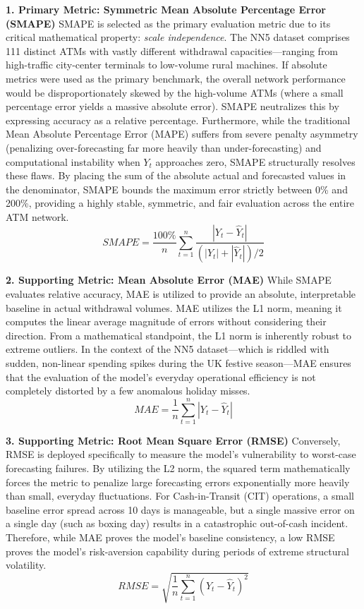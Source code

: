 \documentclass[conference, 12pt, onecolumn]{IEEEtran}
\begin{document}
\textbf{1. Primary Metric: Symmetric Mean Absolute Percentage Error (SMAPE)}
SMAPE is selected as the primary evaluation metric due to its critical mathematical property: \textit{scale independence}. The NN5 dataset comprises 111 distinct ATMs with vastly different withdrawal capacities—ranging from high-traffic city-center terminals to low-volume rural machines. If absolute metrics were used as the primary benchmark, the overall network performance would be disproportionately skewed by the high-volume ATMs (where a small percentage error yields a massive absolute error). SMAPE neutralizes this by expressing accuracy as a relative percentage. Furthermore, while the traditional Mean Absolute Percentage Error (MAPE) suffers from severe penalty asymmetry (penalizing over-forecasting far more heavily than under-forecasting) and computational instability when $Y_t$ approaches zero, SMAPE structurally resolves these flaws. By placing the sum of the absolute actual and forecasted values in the denominator, SMAPE bounds the maximum error strictly between 0\% and 200\%, providing a highly stable, symmetric, and fair evaluation across the entire ATM network.
$$SMAPE = \frac{100\%}{n} \sum_{t=1}^n \frac{|Y_t - \hat{Y}_t|}{(|Y_t| + |\hat{Y}_t|)/2}$$

\textbf{2. Supporting Metric: Mean Absolute Error (MAE)}
While SMAPE evaluates relative accuracy, MAE is utilized to provide an absolute, interpretable baseline in actual withdrawal volumes. MAE utilizes the L1 norm, meaning it computes the linear average magnitude of errors without considering their direction. From a mathematical standpoint, the L1 norm is inherently robust to extreme outliers. In the context of the NN5 dataset—which is riddled with sudden, non-linear spending spikes during the UK festive season—MAE ensures that the evaluation of the model's everyday operational efficiency is not completely distorted by a few anomalous holiday misses.
$$MAE = \frac{1}{n} \sum_{t=1}^n |Y_t - \hat{Y}_t|$$

\textbf{3. Supporting Metric: Root Mean Square Error (RMSE)}
Conversely, RMSE is deployed specifically to measure the model's vulnerability to worst-case forecasting failures. By utilizing the L2 norm, the squared term mathematically forces the metric to penalize large forecasting errors exponentially more heavily than small, everyday fluctuations. For Cash-in-Transit (CIT) operations, a small baseline error spread across 10 days is manageable, but a single massive error on a single day (such as boxing day) results in a catastrophic out-of-cash incident. Therefore, while MAE proves the model's baseline consistency, a low RMSE proves the model's risk-aversion capability during periods of extreme structural volatility.
$$RMSE = \sqrt{\frac{1}{n} \sum_{t=1}^n (Y_t - \hat{Y}_t)^2}$$
\end{document}
